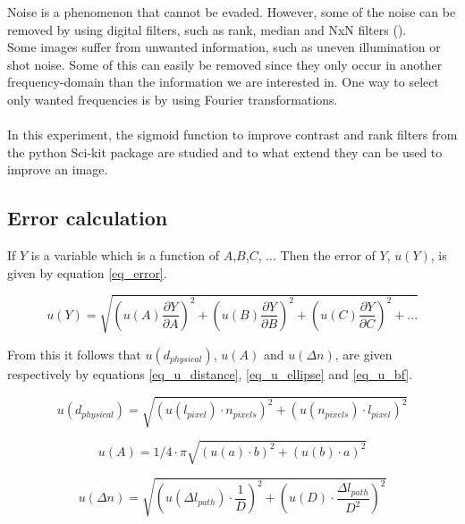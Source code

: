 Noise is a phenomenon that cannot be evaded. However, some of the noise can be removed by using digital filters, such as rank, median and NxN filters (\cite{tutorial}).\\
Some images suffer from unwanted information, such as uneven illumination or shot noise. Some of this can easily be removed since they only  occur in another frequency-domain than the information we are interested in. One way to select only wanted frequencies is by using Fourier transformations.\\

\\
In this experiment, the sigmoid function to improve contrast and rank filters from the python Sci-kit package are studied and to what extend they can be used to improve an image.


\subsection{Error calculation}

If $Y$ is a variable which is a function of $A$,$B$,$C$, ... Then the error of $Y$, $u(Y)$, is given by equation \ref{eq_error}.

\begin{equation}
	\label{eq_error}
	u(Y) = \sqrt{\left(u(A) \frac{\partial Y}{\partial A}\right)^2 + \left(u(B) \frac{\partial Y}{\partial B}\right)^2 + \left(u(C) \frac{\partial Y}{\partial C}\right)^2 + ...}
\end{equation}

From this it follows that $u(d_{physical})$, $u(A)$ and $u(\Delta n)$, are given respectively by equations \ref{eq_u_distance}, \ref{eq_u_ellipse} and \ref{eq_u_bf}.

\begin{equation}
	\label{eq_u_distance}
	u(d_{physical}) = \sqrt{\left( u(l_{pixel}) \cdot n_{pixels} \right)^2 + \left( u(n_{pixels}) \cdot l_{pixel} \right)^2}
\end{equation}

\begin{equation}
	\label{eq_u_ellipse}
	u(A) = 1/4 \cdot \pi  \sqrt{(u(a) \cdot b)^2 + (u(b) \cdot a)^2}
\end{equation}

\begin{equation}
	\label{eq_u_bf}
	u(\Delta n) = \sqrt{\left( u(\Delta l_{path}) \cdot \frac{1}{D}\right)^2 + \left( u(D) \cdot \frac{\Delta l_{path}}{D^2}\right)^2}
\end{equation}
